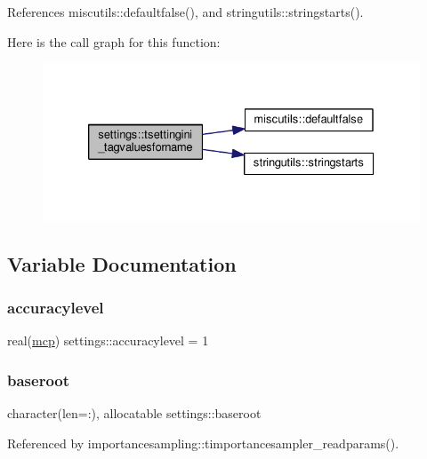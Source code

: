 References miscutils\+::defaultfalse(), and stringutils\+::stringstarts().

Here is the call graph for this function\+:
\nopagebreak
\begin{figure}[H]
\begin{center}
\leavevmode
\includegraphics[width=330pt]{namespacesettings_ad76733b3c1bf3cec0d9401ce6d924a38_cgraph}
\end{center}
\end{figure}


\subsection{Variable Documentation}
\mbox{\label{namespacesettings_a815a186f7293c7e58833ae29fee76454}} 
\subsubsection{\texorpdfstring{accuracylevel}{accuracylevel}}
{\footnotesize\ttfamily real(\mbox{\hyperlink{namespacesettings_a341fa0fe410054f78630c33e118669bf}{mcp}}) settings\+::accuracylevel = 1}

\mbox{\label{namespacesettings_aa942779910692a37fbc12dd25f62877e}} 
\subsubsection{\texorpdfstring{baseroot}{baseroot}}
{\footnotesize\ttfamily character(len=\+:), allocatable settings\+::baseroot}



Referenced by importancesampling\+::timportancesampler\+\_\+readparams().

\mbox{\label{namespacesettings_a45cb647c4940062ae812ef3a374e5e2f}} 
